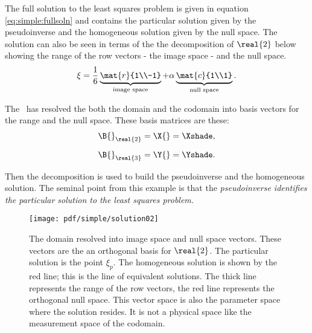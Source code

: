 The full solution to the least squares problem is given in equation \eqref{eq:simple:fullsoln} and contains the particular solution given by the pseudoinverse and the homogeneous solution given by the null space. The solution can also be seen in terms of the the decomposition of $\real{2}$ below showing the range of the row vectors - the image space - and the null space.
\begin{equation}
    \xi = \frac{1}{6}\underbrace{\mat{r}{1\\-1}}_{\text{image space}} + \alpha \underbrace{\mat{c}{1\\1}}_{\text{null space}}.
\end{equation}

The \svdl \ has resolved the both the domain and the codomain into basis vectors for the range and the null space. These basis matrices are these:
\begin{equation}
  \begin{split}
  \B{}_{\real{2}} &=\X{}= \Xshade,\\[5pt]
  \B{}_{\real{3}} &=\Y{}=\Yshade.
  \end{split}
\end{equation}

Then the decomposition is used to build the pseudoinverse and the homogeneous solution. The seminal point from this example is that the \textit{pseudoinverse identifies the particular solution to the least squares problem.} 

\begin{figure}[htbp] %
   \centering
   \texttt{[image: pdf/simple/solution02]} 
   \caption[The domain resolved into image space and null space vectors]{The domain resolved into image space and null space vectors. These vectors are the an orthogonal basis for $\real{2}$. The particular solution is the point $\xi_{p}$. The homogeneous solution is shown by the red line; this is the line of equivalent solutions. The thick line represents the range of the row vectors, the red line represents the orthogonal null space. This vector space is also the parameter space where the solution resides. It is not a physical space like the measurement space of the codomain.}
   \label{fig:simple:solution}
\end{figure}

